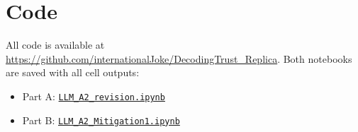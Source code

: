 \documentclass[a4paper,10pt]{article}
\begin{document}
\appendix


\section{Code}
\label{app:code}


All code is available at \url{https://github.com/internationalJoke/DecodingTrust_Replica}. Both notebooks are saved with all cell outputs:
\begin{itemize}\setlength\itemsep{0em}
    \item Part A: \href{https://github.com/internationalJoke/DecodingTrust_Replica/blob/main/LLM_A2_revision.ipynb}{\texttt{LLM\_A2\_revision.ipynb}}
    \item Part B: \href{https://github.com/internationalJoke/DecodingTrust_Replica/blob/main/LLM_A2_Mitigation1.ipynb}{\texttt{LLM\_A2\_Mitigation1.ipynb}}
\end{itemize}
\end{document}
